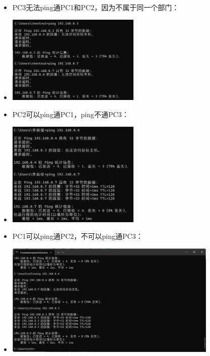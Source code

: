 \documentclass{article}
\begin{document}
\begin{itemize}
    \item PC3无法ping通PC1和PC2，因为不属于同一个部门：
    \item \vspace{10pt}
    \centerline{\includegraphics[width=0.5\textwidth]{2_5_images/2.png}}
    \vspace{10pt}
    \item PC2可以ping通PC1，ping不通PC3：
    \item \vspace{10pt}
    \centerline{\includegraphics[width=0.5\textwidth]{2_5_images/3.png}}
    \vspace{10pt}
    \item PC1可以ping通PC2，不可以ping通PC3：
    \item \vspace{10pt}
    \centerline{\includegraphics[width=0.8\textwidth]{2_5_images/4.png}}
    \vspace{10pt}
\end{itemize}
\end{document}
